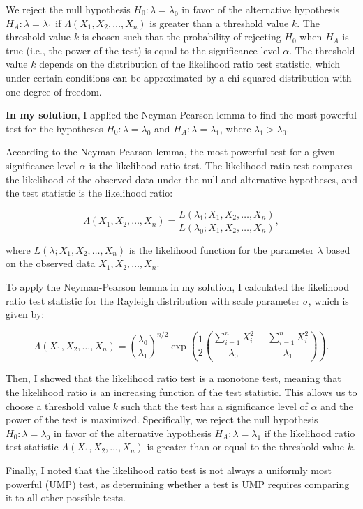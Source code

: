 \documentclass[11pt]{article}
\begin{document}
We reject the null hypothesis $H_0: \lambda = \lambda_0$ in favor of the alternative hypothesis $H_A: \lambda = \lambda_1$ if $\Lambda(X_1, X_2, \ldots, X_n)$ is greater than a threshold value $k$. The threshold value $k$ is chosen such that the probability of rejecting $H_0$ when $H_A$ is true (i.e., the power of the test) is equal to the significance level $\alpha$. The threshold value $k$ depends on the distribution of the likelihood ratio test statistic, which under certain conditions can be approximated by a chi-squared distribution with one degree of freedom.

\textbf{In my solution}, I applied the Neyman-Pearson lemma to find the most powerful test for the hypotheses $H_0: \lambda = \lambda_0$ and $H_A: \lambda = \lambda_1$, where $\lambda_1 > \lambda_0$.

According to the Neyman-Pearson lemma, the most powerful test for a given significance level $\alpha$ is the likelihood ratio test. The likelihood ratio test compares the likelihood of the observed data under the null and alternative hypotheses, and the test statistic is the likelihood ratio:

$$\Lambda(X_1,X_2,\ldots,X_n) = \frac{L(\lambda_1; X_1, X_2, \ldots, X_n)}{L(\lambda_0; X_1, X_2, \ldots, X_n)},$$

where $L(\lambda; X_1, X_2, \ldots, X_n)$ is the likelihood function for the parameter $\lambda$ based on the observed data $X_1,X_2,\ldots,X_n$.

To apply the Neyman-Pearson lemma in my solution, I calculated the likelihood ratio test statistic for the Rayleigh distribution with scale parameter $\sigma$, which is given by:

$$ \Lambda(X_1, X_2, \ldots, X_n) = \left(\frac{\lambda_0}{\lambda_1}\right)^{n/2} \exp\left(\frac{1}{2}\left(\frac{\sum_{i=1}^n X_i^2}{\lambda_0} - \frac{\sum_{i=1}^n X_i^2}{\lambda_1}\right)\right). $$

Then, I showed that the likelihood ratio test is a monotone test, meaning that the likelihood ratio is an increasing function of the test statistic. This allows us to choose a threshold value $k$ such that the test has a significance level of $\alpha$ and the power of the test is maximized. Specifically, we reject the null hypothesis $H_0: \lambda = \lambda_0$ in favor of the alternative hypothesis $H_A: \lambda = \lambda_1$ if the likelihood ratio test statistic $\Lambda(X_1,X_2,\ldots,X_n)$ is greater than or equal to the threshold value $k$.

Finally, I noted that the likelihood ratio test is not always a uniformly most powerful (UMP) test, as determining whether a test is UMP requires comparing it to all other possible tests.
\end{document}
